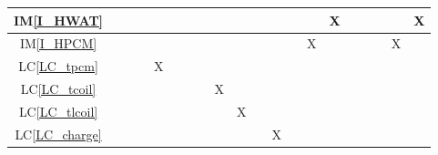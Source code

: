 \documentclass[12pt]{article}
\newcommand{\iref}[1]{IM\ref{#1}}
\newcommand{\lcref}[1]{LC\ref{#1}}
\begin{document}
{\begin{landscape}
\begin{table}[h!]
\begin{tabular}{|c|c|c|c|c|c|c|c|c|c|c|c|c|c|c|c|c|c|c|c|}
				\iref{I_HWAT}       &                            &                 &                &               &                        &                  &                    &                &                 &                   &                 &                   &                     & X                &                &                   &               &                    & X                 \\ \hline
				\iref{I_HPCM}       &                            &                 &                &               &                        &                  &                    &                &                 &                   &                 &                   & X                   &                  &                &                   &               & X                  &                   \\ \hline
				\lcref{LC_tpcm}     &                            &                 &                & X             &                        &                  &                    &                &                 &                   &                 &                   &                     &                  &                &                   &               &                    &                   \\ \hline
				\lcref{LC_tcoil}    &                            &                 &                &               &                        &                  &                    & X              &                 &                   &                 &                   &                     &                  &                &                   &               &                    &                   \\ \hline
				\lcref{LC_tlcoil}   &                            &                 &                &               &                        &                  &                    &                & X               &                   &                 &                   &                     &                  &                &                   &               &                    &                   \\ \hline
				\lcref{LC_charge}   &                            &                 &                &               &                        &                  &                    &                &                 &                   & X               &                   &                     &                  &                &                   &               &                    &                   \\ \hline

\end{tabular}
\end{table}
\end{landscape}}
\end{document}
